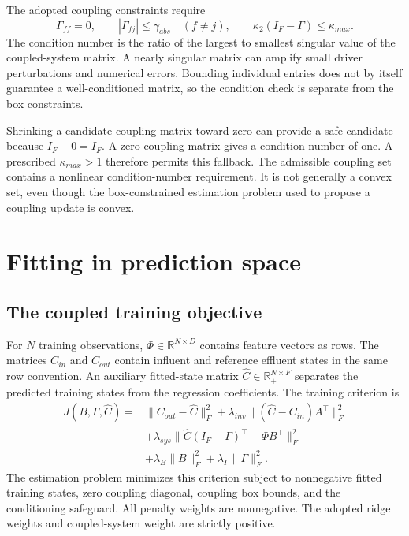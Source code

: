 The adopted coupling constraints require
\begin{equation}
\label{eq:icsor_coupling_safeguards}
\Gamma_{ff}=0,
\qquad |\Gamma_{fj}|\leq\gamma_{abs}\quad(f\neq j),
\qquad \kappa_2(I_F-\Gamma)\leq\kappa_{max}.
\end{equation}
The condition number is the ratio of the largest to smallest singular value of the coupled-system matrix. A nearly singular matrix can amplify small driver perturbations and numerical errors. Bounding individual entries does not by itself guarantee a well-conditioned matrix, so the condition check is separate from the box constraints.

Shrinking a candidate coupling matrix toward zero can provide a safe candidate because \(I_F-0=I_F\). A zero coupling matrix gives a condition number of one. A prescribed \(\kappa_{max}>1\) therefore permits this fallback. The admissible coupling set contains a nonlinear condition-number requirement. It is not generally a convex set, even though the box-constrained estimation problem used to propose a coupling update is convex.

\section{Fitting in prediction space}

\subsection{The coupled training objective}

For \(N\) training observations, \(\Phi\in\mathbb{R}^{N\times D}\) contains feature vectors as rows. The matrices \(C_{in}\) and \(C_{out}\) contain influent and reference effluent states in the same row convention. An auxiliary fitted-state matrix \(\widehat C\in\mathbb{R}_{+}^{N\times F}\) separates the predicted training states from the regression coefficients. The training criterion is
\begin{equation}
\label{eq:icsor_training_objective}
\begin{aligned}
J(B,\Gamma,\widehat C)={}&
\|C_{out}-\widehat C\|_F^2
+\lambda_{inv}\| (\widehat C-C_{in})A^\top\|_F^2\\
&+\lambda_{sys}\|\widehat C(I_F-\Gamma)^\top-\Phi B^\top\|_F^2\\
&+\lambda_B\|B\|_F^2+\lambda_{\Gamma}\|\Gamma\|_F^2.
\end{aligned}
\end{equation}
The estimation problem minimizes this criterion subject to nonnegative fitted training states, zero coupling diagonal, coupling box bounds, and the conditioning safeguard. All penalty weights are nonnegative. The adopted ridge weights and coupled-system weight are strictly positive.

